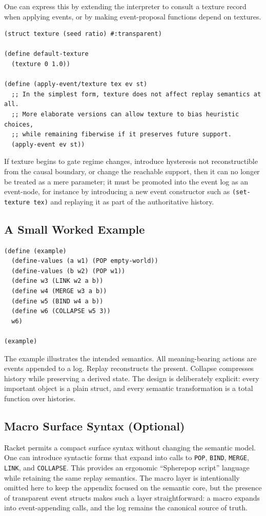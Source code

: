 \documentclass[11pt]{article}
\begin{document}
One can express this by extending the interpreter to consult a texture record
when applying events, or by making event-proposal functions depend on textures.

\begin{verbatim}
(struct texture (seed ratio) #:transparent)

(define default-texture
  (texture 0 1.0))

(define (apply-event/texture tex ev st)
  ;; In the simplest form, texture does not affect replay semantics at all.
  ;; More elaborate versions can allow texture to bias heuristic choices,
  ;; while remaining fiberwise if it preserves future support.
  (apply-event ev st))
\end{verbatim}

If texture begins to gate regime changes, introduce hysteresis not reconstructible
from the causal boundary, or change the reachable support, then it can no longer
be treated as a mere parameter; it must be promoted into the event log as an
event-node, for instance by introducing a new event constructor such as
\texttt{(set-texture tex)} and replaying it as part of the authoritative history.

\subsection{A Small Worked Example}

\begin{verbatim}
(define (example)
  (define-values (a w1) (POP empty-world))
  (define-values (b w2) (POP w1))
  (define w3 (LINK w2 a b))
  (define w4 (MERGE w3 a b))
  (define w5 (BIND w4 a b))
  (define w6 (COLLAPSE w5 3))
  w6)

(example)
\end{verbatim}

The example illustrates the intended semantics. All meaning-bearing actions are
events appended to a log. Replay reconstructs the present. Collapse compresses
history while preserving a derived state. The design is deliberately explicit:
every important object is a plain struct, and every semantic transformation is a
total function over histories.

\subsection{Macro Surface Syntax (Optional)}

Racket permits a compact surface syntax without changing the semantic model. One
can introduce syntactic forms that expand into calls to \texttt{POP}, \texttt{BIND},
\texttt{MERGE}, \texttt{LINK}, and \texttt{COLLAPSE}. This provides an ergonomic
``Spherepop script'' language while retaining the same replay semantics. The
macro layer is intentionally omitted here to keep the appendix focused on the
semantic core, but the presence of transparent event structs makes such a layer
straightforward: a macro expands into event-appending calls, and the log remains
the canonical source of truth.
\end{document}
